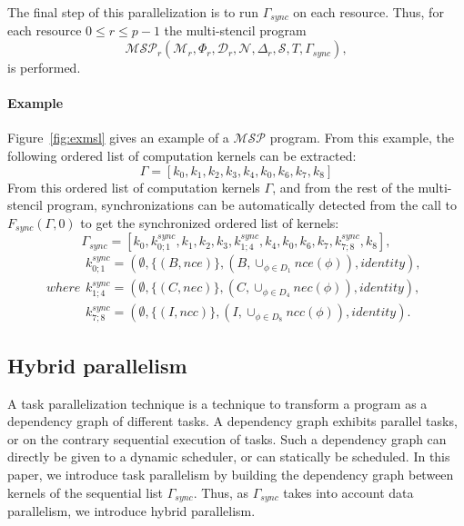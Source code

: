  The final step of this parallelization is to run $\Gamma_{sync}$ on each resource. Thus, for each resource $0 \leq r \leq p-1$ the multi-stencil program 
\begin{equation}
\mathcal{MSP}_r(\mathcal{M}_r,\Phi_r,\mathcal{D}_r,\mathcal{N},\Delta_r,\mathcal{S},T,\Gamma_{sync}),
\end{equation}
is performed.

\paragraph{\textbf{Example}} Figure~\ref{fig:exmsl} gives an example of a $\mathcal{MSP}$ program. From this example, the following ordered list of computation kernels can be extracted:
\begin{equation*}
\Gamma = [k_0,k_1,k_2,k_3,k_4,k_0,k_6,k_7,k_8]
\end{equation*}
From this ordered list of computation kernels $\Gamma$, and from the rest of the multi-stencil program, synchronizations can be automatically detected from the call to $F_{sync}(\Gamma,0)$ to get the synchronized ordered list of kernels:
\begin{equation}
\Gamma_{sync} = [k_0,k_{0;1}^{sync},k_1,k_2,k_3,k_{1;4}^{sync},k_4,k_0,k_6,k_7,k_{7;8}^{sync},k_8],
\label{eq:exsync}
\end{equation}
\begin{subequations}
where
\begin{align}
        k_{0;1}^{sync}=(\emptyset,\{(B,nce)\},(B,\cup_{\phi \in D_1} nce(\phi)),identity),\\
        k_{1;4}^{sync}=(\emptyset,\{(C,nec)\},(C,\cup_{\phi \in D_4} nec(\phi)),identity),\\
        k_{7;8}^{sync}=(\emptyset,\{(I,ncc)\},(I,\cup_{\phi \in D_8} ncc(\phi)),identity).
\end{align}
\end{subequations}

\subsection{Hybrid parallelism}
A task parallelization technique is a technique to transform a program as a dependency graph of different tasks. A dependency graph exhibits parallel tasks, or on the contrary sequential execution of tasks. Such a dependency graph can directly be given to a dynamic scheduler, or can statically be scheduled. In this paper, we introduce task parallelism by building the dependency graph between kernels of the sequential list $\Gamma_{sync}$. Thus, as $\Gamma_{sync}$ takes into account data parallelism, we introduce hybrid parallelism.

